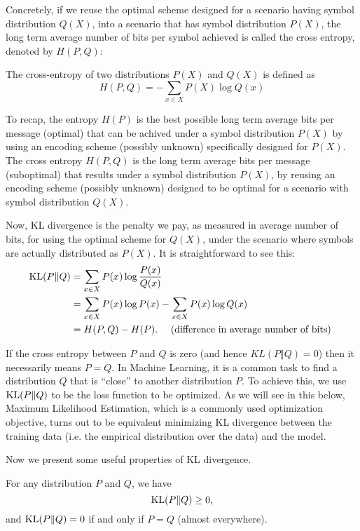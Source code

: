 \documentclass[a4paper]{article}
\begin{document}
Concretely, if we reuse the optimal scheme designed for a 
scenario having symbol distribution $Q(X)$, into a scenario 
that has symbol distribution $P(X)$, the long term average 
number of bits per symbol achieved is called the cross entropy, 
denoted by $H(P,Q)$:

\begin{defi}
  The cross-entropy of two distributions $P(X)$
  and $Q(X)$ is defined as 
  \[
  H(P, Q) = - \sum_{x \in X} P(X) \log Q(x) 
  \]
\end{defi}

To recap, the entropy $H(P)$ is the best possible long term 
average bits per message (optimal) that can be achived under 
a symbol distribution $P(X)$ by using an encoding scheme 
(possibly unknown) specifically designed for $P(X)$. 
The cross entropy $H(P,Q)$ is the long term average bits 
per message (suboptimal) that results under a symbol 
distribution $P(X)$, by reusing an encoding scheme 
(possibly unknown) designed to be optimal for a scenario 
with symbol distribution $Q(X)$.

Now, KL divergence is the penalty we pay, as measured in 
average number of bits, for using the optimal scheme for 
$Q(X)$, under the scenario where symbols are actually 
distributed as $P(X)$. It is straightforward to see this:
\[
\begin{aligned}
  \operatorname{KL}(P \Vert Q) 
  &= \sum_{x \in X} P(x) \log \frac{P(x)}{Q(x)} \\
  &= \sum_{x \in X} P(x) \log P(x) - \sum_{x \in X} 
  P(x) \log Q(x) \\
  &= H(P, Q) - H(P). 
  \quad \text{ (difference in average number of bits) }
\end{aligned}
\]

If the cross entropy between $P$ and $Q$ is zero 
(and hence $KL(P \Vert Q) = 0$) then it necessarily 
means $P = Q$. In Machine Learning, it is a common 
task to find a distribution $Q$ that is ``close'' to 
another distribution $P$. To achieve this, we use 
$\operatorname{KL}(P \Vert Q)$ to be the loss function to be optimized. 
As we will see in this below, Maximum Likelihood 
Estimation, which is a commonly used optimization objective, 
turns out to be equivalent minimizing KL divergence between 
the training data (i.e. the empirical distribution over the 
data) and the model.

Now we present some useful properties of KL divergence.

\begin{thm}
  For any distribution $P$ and $Q$, we have 
  \[
  \operatorname{KL}(P \Vert Q) \geq 0,
  \]
  and $\operatorname{KL}(P \Vert Q) = 0$ if and only if $P = Q$ (almost 
  everywhere).
\end{thm}
\end{document}
